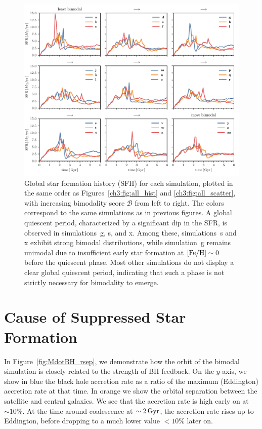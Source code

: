 \begin{appendices}
\begin{figure}
  \centering
  \includegraphics[width=\textwidth]{ch3/sfh.pdf}
  \caption{Global star formation history (SFH) for each simulation, plotted in the same order as Figures~\ref{ch3:fig:all_hist} and \ref{ch3:fig:all_scatter}, with increasing bimodality score $\mathcal{B}$ from left to right. The colors correspond to the same simulations as in previous figures. A global quiescent period, characterized by a significant dip in the SFR, is observed in simulations~g, s, and x. Among these, simulations~s and x exhibit strong bimodal \MgFe{} distributions, while simulation~g remains unimodal due to insufficient early star formation at $[\textrm{Fe}/\textrm{H}]\sim0$ before the quiescent phase. Most other simulations do not display a clear global quiescent period, indicating that such a phase is not strictly necessary for bimodality to emerge.}
  \label{fig:all_sfh}
\end{figure}

\section{Cause of Suppressed Star Formation}\label{ch3:app:cause_qui}
In Figure~\ref{fig:MdotBH_rsep}, we demonstrate how the orbit of the bimodal simulation is closely related to the strength of BH feedback. On the $y$-axis, we show in blue the black hole accretion rate as a ratio of the maximum (Eddington) accretion rate at that time. In orange we show the orbital separation between the satellite and central galaxies. We see that the accretion rate is high early on at $\sim10\%$. At the time around coalescence at $\sim2\,\textrm{Gyr}$, the accretion rate rises up to Eddington, before dropping to a much lower value $<10\%$ later on.


\end{appendices}
